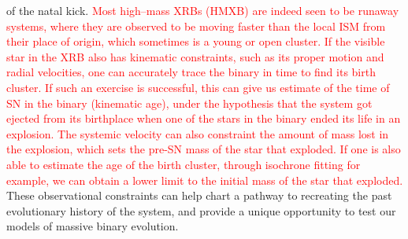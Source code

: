 \documentclass[linenumbers,trackchanges,twocolumn]{aastex701}
\newcommand{\Mdot}{\mathrm{M}_{\odot}}
\newcommand{\red}{\textcolor{red}}
\begin{document}
of the natal kick. \red{Most high--mass XRBs (HMXB) are indeed seen to be runaway systems, where they are observed to be moving faster than the local ISM from their place of origin, which sometimes is a young or open cluster. If the visible star in the XRB also has kinematic constraints, such as its proper motion and radial velocities, one can accurately trace the binary in time to find its birth cluster. If such an exercise is successful, this can give us estimate of the time of SN in the binary (kinematic age), under the hypothesis that the system got ejected from its birthplace when one of the stars in the binary ended its life in an explosion. The systemic velocity can also constraint the amount of mass lost in the explosion, which sets the pre-SN mass of the star that exploded. If one is also able to estimate the age of the birth cluster, through isochrone fitting for example, we can obtain a lower limit to the initial mass of the star that exploded.} These observational constraints can help chart a pathway to recreating the past evolutionary history of the system, and provide a unique opportunity to test our models of massive binary evolution.  

\end{document}
